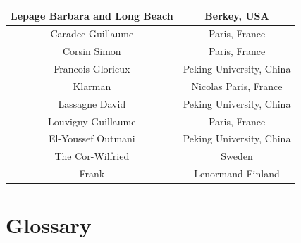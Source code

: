 \documentclass {life-en}
\begin{document}
\begin{tabular}{| c | c |}
  \hline
  Lepage Barbara and Long Beach & Berkey, USA \\
  \hline
  Caradec Guillaume & Paris, France \\
  \hline
  Corsin Simon & Paris, France \\
  \hline
  Francois Glorieux & Peking University, China \\
  \hline
  Klarman & Nicolas Paris, France \\
  \hline
  Lassagne David & Peking University, China \\
  \hline
  Louvigny Guillaume & Paris, France \\
  \hline
  El-Youssef Outmani & Peking University, China \\
  \hline
  The Cor-Wilfried & Sweden \\
  \hline
  Frank & Lenormand Finland \\
  \hline
\end{tabular}

\newpage

\section{Glossary}
\end{document}
